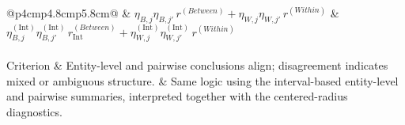 \documentclass[preprint, times, 12pt, authoryear]{elsarticle}
\begin{document}
\begin{table}[ht]
{\begin{tabular}{@{}p{4cm}p{4.8cm}p{5.8cm}@{}}
			& $\eta_{B,j}\eta_{B,j'}\,r^{(Between)}+\eta_{W,j}\eta_{W,j'}\,r^{(Within)}$
			& $\eta_{B,j}^{(\mathrm{Int})}\eta_{B,j'}^{(\mathrm{Int})}\,r_{\mathrm{Int}}^{(Between)}+\eta_{W,j}^{(\mathrm{Int})}\eta_{W,j'}^{(\mathrm{Int})}\,r^{(Within)}$ \\
			\midrule
			 \\
			\quad Criterion
			& Entity-level and pairwise conclusions align; disagreement indicates mixed or ambiguous structure.
			& Same logic using the interval-based entity-level and pairwise summaries, interpreted together with the centered-radius diagnostics. \\
			\bottomrule
		\end{tabular}%
	}
\end{table}
\end{document}
